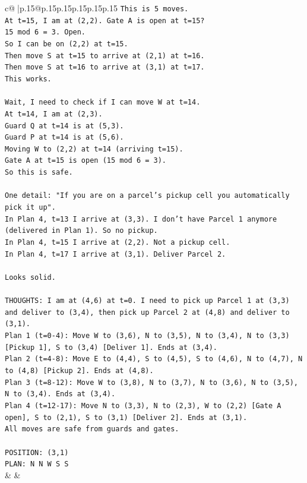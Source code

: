 \documentclass{article}
\begin{document}
{\begin{supertabular}{c@{$\;$}|p{.15\linewidth}@{}p{.15\linewidth}p{.15\linewidth}p{.15\linewidth}p{.15\linewidth}p{.15\linewidth}}
{{{\texttt{This is 5 moves.} \\
\texttt{At t=15, I am at (2,2). Gate A is open at t=15?} \\
\texttt{15 mod 6 = 3. Open.} \\
\texttt{So I can be on (2,2) at t=15.} \\
\texttt{Then move S at t=15 to arrive at (2,1) at t=16.} \\
\texttt{Then move S at t=16 to arrive at (3,1) at t=17.} \\
\texttt{This works.} \\
\\ 
\texttt{Wait, I need to check if I can move W at t=14.} \\
\texttt{At t=14, I am at (2,3).} \\
\texttt{Guard Q at t=14 is at (5,3).} \\
\texttt{Guard P at t=14 is at (5,6).} \\
\texttt{Moving W to (2,2) at t=14 (arriving t=15).} \\
\texttt{Gate A at t=15 is open (15 mod 6 = 3).} \\
\texttt{So this is safe.} \\
\\ 
\texttt{One detail: "If you are on a parcel's pickup cell you automatically pick it up".} \\
\texttt{In Plan 4, t=13 I arrive at (3,3). I don't have Parcel 1 anymore (delivered in Plan 1). So no pickup.} \\
\texttt{In Plan 4, t=15 I arrive at (2,2). Not a pickup cell.} \\
\texttt{In Plan 4, t=17 I arrive at (3,1). Deliver Parcel 2.} \\
\\ 
\texttt{Looks solid.} \\
\\ 
\texttt{THOUGHTS: I am at (4,6) at t=0. I need to pick up Parcel 1 at (3,3) and deliver to (3,4), then pick up Parcel 2 at (4,8) and deliver to (3,1).} \\
\texttt{Plan 1 (t=0{-}4): Move W to (3,6), N to (3,5), N to (3,4), N to (3,3) {[}Pickup 1{]}, S to (3,4) {[}Deliver 1{]}. Ends at (3,4).} \\
\texttt{Plan 2 (t=4{-}8): Move E to (4,4), S to (4,5), S to (4,6), N to (4,7), N to (4,8) {[}Pickup 2{]}. Ends at (4,8).} \\
\texttt{Plan 3 (t=8{-}12): Move W to (3,8), N to (3,7), N to (3,6), N to (3,5), N to (3,4). Ends at (3,4).} \\
\texttt{Plan 4 (t=12{-}17): Move N to (3,3), N to (2,3), W to (2,2) {[}Gate A open{]}, S to (2,1), S to (3,1) {[}Deliver 2{]}. Ends at (3,1).} \\
\texttt{All moves are safe from guards and gates.} \\
\\ 
\texttt{POSITION: (3,1)} \\
\texttt{PLAN: N N W S S} \\
            }
        }
    }
    & & \\ \\


\end{supertabular}}
\end{document}
